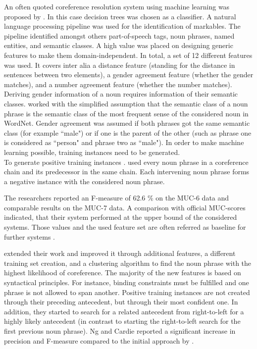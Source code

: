 An often quoted coreference resolution system using machine learning was proposed by \cite{soon2001machine}. In this case decision trees was chosen as a classifier. A natural language processing pipeline was used for the identification of markables. The pipeline identified amongst others part-of-speech tags, noun phrases, named entities, and semantic classes. A high value was placed on designing generic features to make them domain-independent. In total, a set of 12 different features was used. It covers inter alia a distance feature (standing for the distance in sentences between two elements), a gender agreement feature (whether the gender matches), and a number agreement feature (whether the number matches). Deriving gender information of a noun requires information of their semantic classes. \cite{soon2001machine} worked with the simplified assumption that the semantic class of a noun phrase is the semantic class of the most frequent sense of the considered noun in WordNet. Gender agreement was assumed if both phrases got the same semantic class (for example “male") or if one is the parent of the other (such as phrase one is considered as “person" and phrase two as “male"). 
In order to make machine learning possible, training instances need to be generated.\\
To generate positive training instances \cite{soon2001machine}. used every noun phrase in a coreference chain and its predecessor in the same chain. Each intervening noun phrase forms a negative instance with the considered noun phrase. 

The researchers reported an F-measure of 62.6 \% on the MUC-6 data and comparable results on the MUC-7 data. A comparison with official MUC-scores indicated, that their system performed at the upper bound of the considered systems. Those values and the used feature set are often referred as baseline for further systems \citep{versley2008bart}.

\citep{ng2002improving} extended their work and improved it through additional features, a different training set creation, and a clustering algorithm to find the noun phrase with the highest likelihood of coreference. The majority of the new features is based on syntactical principles. For instance, binding constraints must be fulfilled and one phrase is not allowed to span another. Positive training instances are not created through their preceding antecedent, but through their most confident one. In addition, they started to search for a related antecedent from right-to-left for a highly likely antecedent (in contrast to starting the right-to-left search for the first previous noun phrase). Ng and Cardie reported a significant increase in precision and F-measure compared to the initial approach by \citep{soon2001machine}.


